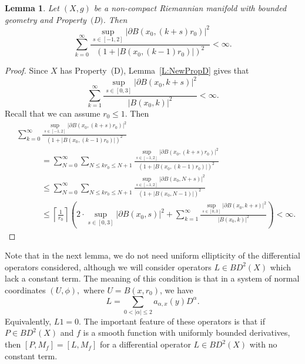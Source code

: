 \documentclass[pdftex]{sigma}
\numberwithin{equation}{section}
\newtheorem{Lemma}[Theorem]{Lemma}
\newcommand{\abs}[1]{\lvert#1\rvert}
\begin{document}
\begin{Lemma}\label{L:Property_D}
 Let $(X,g)$ be a non-compact Riemannian manifold with bounded geometry and Property~$($D$)$. Then \begin{equation}\label{Condition1}
 \sum_{k=0}^\infty \frac{\sup_{s \in [-1, 2]}\abs{\partial B(x_0, (k+s)r_0)}^2}{(1+\abs{B(x_0,(k-1)r_0)})^2} <\infty.
\end{equation}
\end{Lemma}
\begin{proof}
 Since $X$ has Property~(D), Lemma~\ref{L:NewPropD} gives that
 \[
 \sum_{k=1}^\infty \frac{\sup_{s \in [0, 3]}\abs{\partial B(x_0, k+s)}^2}{\abs{B(x_0,k)}^2} < \infty.
 \]
 Recall that we can assume $r_0 \leq 1$. Then
 \begin{align*}
 &\sum_{k=0}^\infty \frac{\sup_{s \in [-1, 2]}\abs{\partial B(x_0, (k+s)r_0)}^2}{(1+\abs{B(x_0,(k-1)r_0)})^2} \\
 &\qquad\quad{} = \sum_{N=0}^\infty \sum_{N \leq kr_0 \leq N+1} \frac{\sup_{s \in [-1, 2]}\abs{\partial B(x_0, (k+s)r_0)}^2}{(1+\abs{B(x_0,(k-1)r_0)})^2}\\
 &\qquad\quad{} \leq \sum_{N=0}^\infty \sum_{N \leq kr_0 \leq N+1} \frac{\sup_{s \in [-1, 2]}\abs{\partial B(x_0, N+s)}^2}{(1+\abs{B(x_0,N-1)})^2}\\
 &\qquad\quad{} \leq \left\lceil \frac{1}{r_0}\right\rceil \left(2\cdot \sup_{s \in [0, 3]}\abs{\partial B(x_0, s)}^2+ \sum_{k=1}^\infty \frac{\sup_{s \in [0, 3]}\abs{\partial B(x_0, k+s)}^2}{\abs{B(x_0,k)}^2}\right) <\infty.
\tag*{\qed}
\end{align*}
\renewcommand{\qed}{}
\end{proof}

Note that in the next lemma, we do not need uniform ellipticity of the differential operators considered, although we will consider operators $L \in BD^2(X)$ which lack a constant term. The meaning of this condition
is that in a system of normal coordinates $(U,\phi),$ where $U = B(x,r_0)$, we have
\[
 L = \sum_{0<|\alpha|\leq 2} a_{\alpha,x}(y)D^{\alpha}.
\]
Equivalently, $L1 = 0.$ The important feature of these operators is that if $P \in BD^2(X)$ and $f$ is a smooth function with uniformly bounded derivatives, then $[P,M_f] = [L, M_f]$ for a differential operator $L\in BD^2(X)$ with no constant term.
\end{document}
